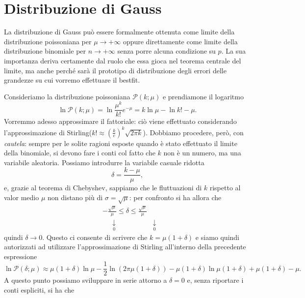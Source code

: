 \documentclass{report}
\begin{document}
\section{Distribuzione di Gauss}
La distribuzione di Gauss può essere formalmente ottenuta come limite della distribuzione poissoniana per $\mu \to +\infty$ oppure direttamente come limite della distribuzione binomiale per $n \to +\infty$ senza porre alcuna condizione su $p$. La sua importanza deriva certamente dal ruolo che essa gioca nel teorema centrale del limite, ma anche perché sarà il prototipo di distribuzione degli errori delle grandezze su cui vorremo effettuare il bestfit. 
\begin{myproof}
	Consideriamo la distribuzione poissoniana $\mathcal{P}(k; \mu)$ e prendiamone il logaritmo
	$$
		\ln{\mathcal{P}(k; \mu)} = \ln{\frac{\mu^k}{k!}e^{-\mu}} = k \ln{\mu} - \ln{k!} - \mu.
	$$
	Vorremmo adesso approssimare il fattoriale: ciò viene effettuato considerando l'approssimazione di Stirling($k! \approx (\frac{k}{e})^k \sqrt{2\pi k}$). Dobbiamo procedere, però, con \emph{cautela}: sempre per le solite ragioni esposte quando è stato effettuato il limite della binomiale, si devono fare i conti col fatto che $k$ non è un numero, ma una variabile aleatoria. Possiamo introdurre la variabile casuale ridotta
	$$
		\delta = \frac{k-\mu}{\mu},
	$$
	e, grazie al teorema di Chebyshev, sappiamo che le fluttuazioni di $k$ rispetto al valor medio $\mu$ non distano più di $\sigma = \sqrt{\mu}$: per confronto si ha allora che
	\[
	\begin{aligned}
    	&-\frac{\sqrt{\mu}}{\mu} \leq \delta \leq \frac{\sqrt{\mu}}{\mu} \\
    	&\, \, \, \, \, \, \, \underset{0}{\downarrow} \phantom{\leq \leq} \, \, \, \, \, \, \, \, \, \, \, \, \,\underset{0}{\downarrow}
	\end{aligned}
	\]
	quindi $\delta \to 0$. Questo ci consente di scrivere che $k = \mu(1 + \delta)$ e siamo quindi autorizzati ad utilizzare l'approssimazione di Stirling all'interno della precedente espressione
	$$
	\ln{\mathcal{P}(\delta; \mu)} \approx \mu(1 + \delta)\ln{\mu} - \frac{1}{2}\ln{(2\pi\mu(1+\delta))} - \mu(1+\delta)\ln{\mu(1+\delta)}+\mu(1+\delta)-\mu.
	$$
	A questo punto possiamo sviluppare in serie attorno a $\delta = 0$ e, senza riportare i conti espliciti, si ha che

\end{myproof}
\end{document}
